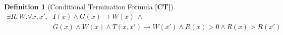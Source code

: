 \documentclass[preprint]{sigplanconf}
\theoremstyle{definition}
\newtheorem{definition}[theorem]{Definition}
\begin{document}
\begin{figure*}
 \begin{framed}

\begin{definition}[Conditional Termination Formula {\bf [CT]}]
\label{def:ct}
 \begin{align*}
  \exists R, W . \forall x, x' . & I(x) \wedge G(x) \rightarrow W(x) ~ \wedge \\
                                 & G(x) \wedge W(x) \wedge T(x, x') \rightarrow W(x') \wedge R(x) > 0 
  \wedge R(x) > R(x')
 \end{align*}
\end{definition}




\end{framed}
\end{figure*}
\end{document}
